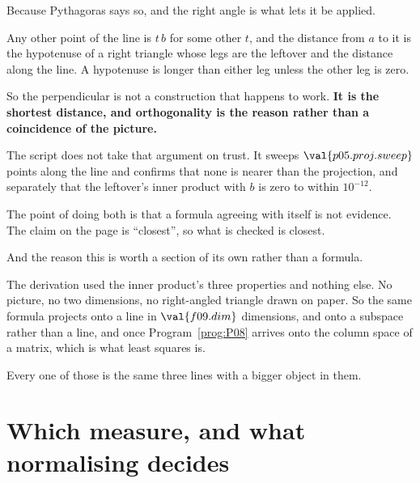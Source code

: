 \begin{fr}
\begin{ansblock}
Because Pythagoras says so, and the right angle is what lets it be applied.
\end{ansblock}

Any other point of the line is $t\,b$ for some other $t$, and the distance from
$a$ to it is the hypotenuse of a right triangle whose legs are the leftover and
the distance along the line. A hypotenuse is longer than either leg unless the
other leg is zero.

So the perpendicular is not a construction that happens to work. \textbf{It is
the shortest distance, and orthogonality is the reason rather than a
coincidence of the picture.}
\end{fr}


\begin{fr}
\begin{note}
The script does not take that argument on trust. It sweeps
$\val{p05.proj.sweep}$ points along the line and confirms that none is nearer
than the projection, and separately that the leftover's inner product with $b$
is zero to within $10^{-12}$.

The point of doing both is that a formula agreeing with itself is not
evidence. The claim on the page is \enquote{closest}, so what is checked is
closest.
\end{note}
\end{fr}

\begin{fr}
And the reason this is worth a section of its own rather than a formula.

The derivation used the inner product's three properties and nothing else. No
picture, no two dimensions, no right-angled triangle drawn on paper. So the
same formula projects onto a line in $\val{f09.dim}$ dimensions, and onto a
subspace rather than a line, and \dash{} once Program~\ref{prog:P08} arrives
\dash{} onto the column space of a matrix, which is what least squares is.

Every one of those is the same three lines with a bigger object in them.
\end{fr}

\section{Which measure, and what normalising decides}
\label{sec:P05-choosing}

